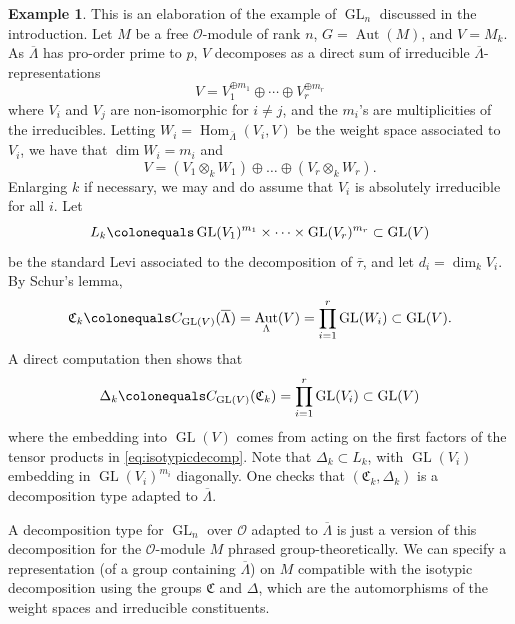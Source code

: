 \documentclass[11pt, letterpaper,english]{amsart}
\theoremstyle{plain}
\theoremstyle{definition}
\newtheorem{example}[lem]{Example}
\numberwithin{equation}{section}
\numberwithin{lem}{section}
\newcommand{\fC}{\mathfrak{C}}
\newcommand{\cO}{\mathcal{O}}
\DeclareMathOperator{\Hom}{Hom}
\newcommand \tensor[1] {\otimes_{#1}}
\DeclareMathOperator{\Aut}{Aut}
\newcommand{\taubar}{{\overline{\tau}}}
\DeclareMathOperator{\GL}{GL}
\newcommand{\Lbar}{\overline{\Lambda}}
\begin{document}
\begin{example} \label{example:gln}
This is an elaboration of the example of $\GL_n$ discussed in the introduction.  Let $M$ be a free $\cO$-module of rank $n$, $G = \Aut(M)$, and $V = M_k$.   As $\Lbar$ has pro-order prime to $p$, $V$ decomposes as a direct sum of irreducible $\Lbar$-representations
\[
V=V_1^{\oplus m_1} \oplus \cdots \oplus V_r^{\oplus m_r} 
\]
where $V_i$ and $V_j$ are non-isomorphic for $i \neq j$, and the $m_i$'s are multiplicities of the irreducibles.  Letting $W_i = \Hom_{\Lbar}(V_i,V)$ be the weight space associated to $V_i$, we have that $\dim W_i = m_i$ and
\begin{equation} \label{eq:isotypicdecomp}
V = (V_1 \tensor{k} W_1) \oplus \ldots \oplus (V_r \tensor{k} W_r).
\end{equation}
Enlarging $k$ if necessary, we may and do assume that $V_i$ is absolutely irreducible for all $i$. 
Let 
\[
L_k \colonequals \GL(V_1)^{m_1} \times \cdots \times \GL(V_r)^{m_r} \subset \GL(V)
\]
be the standard Levi associated to the decomposition of $\taubar$, and let $d_i=\dim_k V_i$.
By Schur's lemma, 
\[
\fC_k \colonequals C_{\GL(V)} (\Lbar) = \Aut_\Lambda(V) = \prod_{i=1}^r \GL(W_i) \subset \GL(V).
\]
A direct computation then shows that
\[
\Delta_k \colonequals C_{\GL(V)}(\fC_k) = \prod_{i=1}^r \GL(V_i) \subset \GL(V)
\]
where the embedding into $\GL(V)$ comes from acting on the first factors of the tensor products in \eqref{eq:isotypicdecomp}.  Note that $\Delta_k \subset L_k$, with $\GL(V_i)$ embedding in $\GL(V_i)^{m_i}$ diagonally.  One checks that $(\fC_k,\Delta_k)$ is a decomposition type adapted to $\Lbar$.

A decomposition type for $\GL_n$ over $\cO$ adapted to $\Lbar$ is just a version of this decomposition for the $\cO$-module $M$ phrased group-theoretically.  We can specify a representation (of a group containing $\Lbar$) on $M$ compatible with the isotypic decomposition using the groups $\fC$ and $\Delta$, which are the automorphisms of the weight spaces and irreducible constituents.  
\end{example}
%
%
%
%
%
%
%
%
%
%

%
%
%
%
%
%
\end{document}
